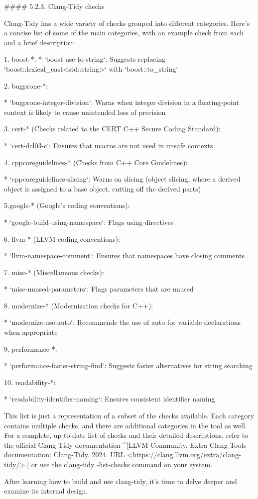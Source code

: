 \begin{markdown}

#### 5.2.3. Clang-Tidy checks

Clang-Tidy has a wide variety of checks grouped into different categories. Here's a concise list of some of the main categories, with an example check from each and a brief description:


1. boost-*:
* `boost-use-to-string`: Suggests replacing `boost::lexical_cast<std::string>` with `boost::to_string`

2. bugprone-*:

* `bugprone-integer-division`: Warns when integer division in a floating-point context is likely to cause unintended loss of precision

3. cert-* (Checks related to the CERT C++ Secure Coding Standard):

* `cert-dcl03-c`: Ensures that macros are not used in unsafe contexts

4. cppcoreguidelines-* (Checks from C++ Core Guidelines):

* `cppcoreguidelines-slicing`: Warns on slicing (object slicing, where a derived object is assigned to a base object, cutting off the derived parts)

5.google-* (Google's coding conventions):

* `google-build-using-namespace`: Flags using-directives

6. llvm-* (LLVM coding conventions):

* `llvm-namespace-comment`: Ensures that namespaces have closing comments

7. misc-* (Miscellaneous checks):

* `misc-unused-parameters`: Flags parameters that are unused

8. modernize-* (Modernization checks for C++):

* `modernize-use-auto`: Recommends the use of auto for variable declarations when appropriate

9. performance-*:

* `performance-faster-string-find`: Suggests faster alternatives for string searching

10. readability-*:

* `readability-identifier-naming`: Ensures consistent identifier naming

This list is just a representation of a subset of the checks available. Each category contains multiple checks, and there are additional categories in the tool as well. For a complete, up-to-date list of checks and their detailed descriptions, refer to the official Clang-Tidy documentation ^[LLVM Community. Extra Clang Tools documentation: Clang-Tidy. 2024. URL <https://clang.llvm.org/extra/clang-tidy/>.] or use the clang-tidy -list-checks command on your system.

After learning how to build and use clang-tidy, it's time to delve deeper and examine its internal design.

\end{markdown}





















